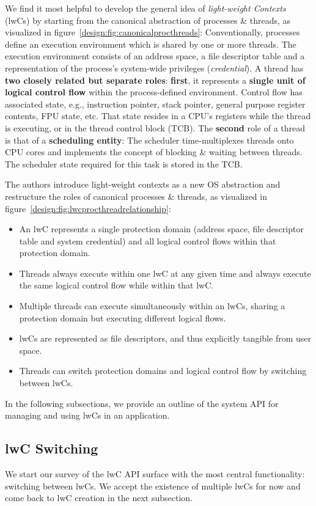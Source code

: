 \documentclass[10pt,twocolumn,a4paper]{article}
\begin{document}
We find it most helpful to develop the general idea of \textit{light-weight Contexts} (lwCs) by starting from the canonical abstraction of processes \& threads, as visualized in figure~\ref{design:fig:canonicalprocthreads}:
Conventionally, processes define an execution environment which is shared by one or more threads.
The execution environment consists of an address space, a file descriptor table and a representation of the process's system-wide privileges (\textit{credential}).
A thread has \textbf{two closely related but separate roles}:
\textbf{first}, it represents a \textbf{single unit of logical control flow} within the process-defined environment.
Control flow has associated state, e.g., instruction pointer, stack pointer, general purpose register contents, FPU state, etc.
That state resides in a CPU's registers while the thread is executing, or in the thread control block (TCB).
The \textbf{second} role of a thread is that of a \textbf{scheduling entity}:
The scheduler time-multiplexes threads onto CPU cores and implements the concept of blocking \& waiting between threads.
The scheduler state required for this task is stored in the TCB.

The authors introduce light-weight contexts as a new OS abstraction and restructure the roles of canonical processes \& threads, as visualized in figure~\ref{design:fig:lwcprocthreadrelationship}:
\begin{itemize}
\item An lwC represents a single protection domain (address space, file descriptor table and system credential) and all logical control flows within that protection domain.
\item Threads always execute within one lwC at any given time and always execute the same logical control flow while within that lwC.
\item Multiple threads can execute simultaneously within an lwCs, sharing a protection domain but executing different logical flows.
\item lwCs are represented as file descriptors, and thus explicitly tangible from user space.
\item Threads can switch protection domains and logical control flow by switching between lwCs.
\end{itemize}
\cite{lwcpaper,lwckernelrepo}

In the following subsections, we provide an outline of the system API for managing and using lwCs in an application.

\subsection{lwC Switching}\label{design:switching}
We start our survey of the lwC API surface with the most central functionality: switching between lwCs.
We accept the existence of multiple lwCs for now and come back to lwC creation in the next subsection.
\end{document}
